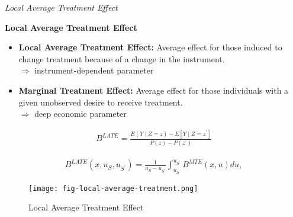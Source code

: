 \begin{frame}\begin{center}
\LARGE\textit{Local Average Treatment Effect}
\end{center}\end{frame}
\begin{frame}
\textbf{Local Average Treatment Effect}

\begin{itemize}
\item \textbf{Local Average Treatment Effect:} Average effect for those induced
to change treatment because of a change in the instrument.\\\vspace{0.2cm}
\(\Rightarrow\) instrument-dependent parameter\vspace{0.4cm}

\item \textbf{Marginal Treatment Effect:} Average effect for those individuals
with a given unobserved desire to receive treatment.\\\vspace{0.2cm}
\(\Rightarrow\) deep economic parameter
\end{itemize}
\end{frame}

\begin{frame}
    \begin{align*}
B^{LATE} = \frac{E(Y\mid Z = z) - E[Y \mid Z = z^\prime]}{P(z) - P(z^\prime)}
\end{align*}

\begin{align*}
B^{LATE}(x, u_S, u_{S^\prime}) = \frac{1}{u_S - u_{S^\prime}} \int_{u_S}^{u_{S^\prime}} B^{MTE}(x, u) du,
\end{align*}

\end{frame}


\begin{frame}
\begin{figure}[htp]\centering
	\caption{Local Average Treatment Effect}\label{Local Average Treatment}\scalebox{0.35}
	{\texttt{[image: fig-local-average-treatment.png]}}
\end{figure}
\end{frame}

